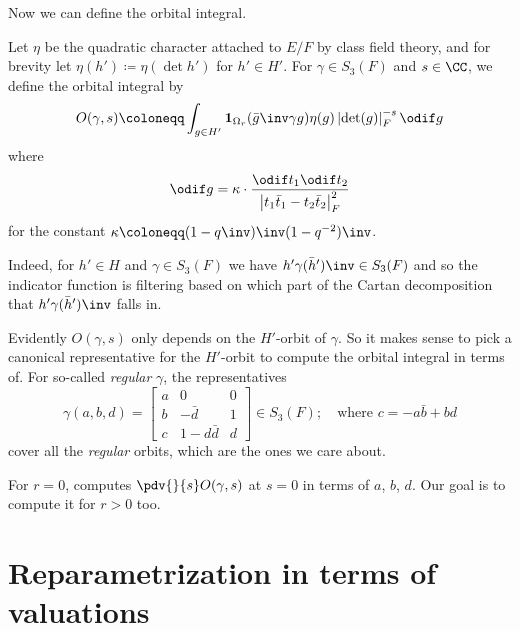 Now we can define the orbital integral.
\begin{definition}
  Let $\eta$ be the quadratic character attached to $E/F$ by class field theory,
  and for brevity let $\eta(h') \coloneqq \eta(\det h')$ for $h' \in H'$.
  For $\gamma \in S_3(F)$ and $s \in \CC$, we define the orbital integral by
  \[ O(\gamma, s) \coloneqq
    \int_{g \in H'} \mathbf{1}_{\Omega_r}(\bar g\inv \gamma g) \eta(g)
    \left\lvert \det(g) \right\rvert_F^{-s} \odif g \]
  where
  \[ \odif g = \kappa \cdot \frac{\odif t_1 \odif t_2}
    {\left\lvert t_1 \bar t_1 - t_2 \bar t_2 \right\rvert_F^2} \]
  for the constant $\kappa \coloneqq (1-q\inv)\inv(1-q^{-2})\inv$.
\end{definition}

Indeed, for $h' \in H$ and $\gamma \in S_3(F)$ we have $h' \gamma (\bar h')\inv \in S_3(F)$
and so the indicator function is filtering based on which part of the
Cartan decomposition that $h' \gamma (\bar h')\inv$ falls in.

Evidently $O(\gamma, s)$ only depends on the $H'$-orbit of $\gamma$.
So it makes sense to pick a canonical representative for the $H'$-orbit to compute
the orbital integral in terms of.
For so-called \emph{regular} $\gamma$, the representatives
\[ \gamma(a,b,d) =
  \begin{bmatrix}
    a & 0 & 0 \\
    b & - \bar d & 1 \\
    c & 1 - d \bar d & d
  \end{bmatrix}
  \in S_3(F); \quad \text{where $c = -a \bar b + b d$} \]
cover all the \emph{regular} orbits, which are the ones we care about.

For $r=0$, \cite{ref:AFL} computes $\pdv{}{s}O(\gamma,s)$ at $s=0$ in terms of $a$, $b$, $d$.
Our goal is to compute it for $r > 0$ too.

\section{Reparametrization in terms of valuations}

